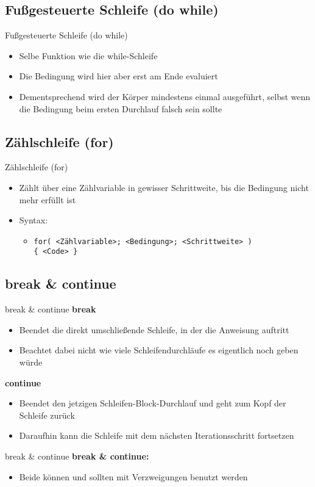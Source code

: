 \subsection{Fußgesteuerte Schleife (do while)}
\begin{frame}{Fußgesteuerte Schleife (do while)}
	\begin{itemize}
		\item Selbe Funktion wie die while-Schleife
		\item Die Bedingung wird hier aber erst am Ende evaluiert
		\item Dementsprechend wird der Körper mindestens einmal ausgeführt, selbst wenn die Bedingung beim ersten Durchlauf falsch sein sollte
	\end{itemize}
		
\end{frame}

\subsection{Zählschleife (for)}
\begin{frame}{Zählschleife (for)}
	\begin{itemize}
		\item Zählt über eine Zählvariable in gewisser Schrittweite, bis die Bedingung nicht mehr erfüllt ist
		\item Syntax:
		\begin{itemize}
			\item \texttt{for( \alert{<Zählvariable>}; \alert{<Bedingung>}; \alert{<Schrittweite>} )\\ \{ \alert{<Code>} \}}
		\end{itemize}
	\end{itemize}
		
\end{frame}

\subsection{break \& continue}
\begin{frame}{break \& continue}
	\textbf{break}\\
	\begin{itemize}
		\item Beendet die direkt umschließende Schleife, in der die Anweisung auftritt
		\item Beachtet dabei nicht wie viele Schleifendurchläufe es eigentlich noch geben würde
	\end{itemize}
	\textbf{continue}\\
	\begin{itemize}
		\item Beendet den jetzigen Schleifen-Block-Durchlauf und geht zum Kopf der Schleife zurück
		\item Daraufhin kann die Schleife mit dem nächsten Iterationsschritt fortsetzen
	\end{itemize}
\end{frame}

\begin{frame}{break \& continue}
	\textbf{break \& continue:}\\
	\begin{itemize}
		\item Beide können und sollten mit Verzweigungen benutzt werden
	\end{itemize}
	
\end{frame}


